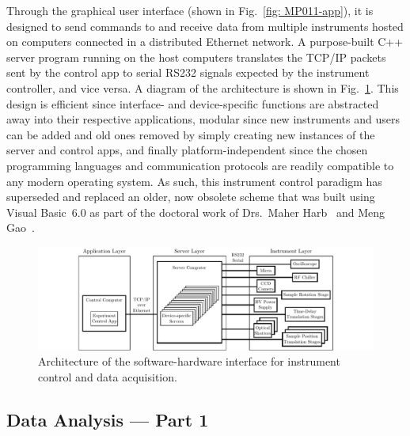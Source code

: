 Through the graphical user interface (shown in Fig.~\ref{fig: MP011-app}),
it is designed to send commands to and receive data from multiple instruments
hosted on computers connected in a distributed Ethernet network.
A purpose-built C++ server program running on the host computers translates
the TCP/IP packets sent by the control app to serial RS232 signals expected by
the instrument controller, and vice versa. A diagram of the architecture
is shown in Fig.~\ref{fig: MP011-net}.
This design is efficient
since interface- and device-specific functions are abstracted away into their respective applications,
modular since new instruments and users can be added and old ones removed
by simply creating new instances of the server and control apps,
and finally platform-independent since the chosen programming languages and communication protocols
are readily compatible to any modern operating system.
As such, this instrument control paradigm has superseded and replaced
an older, now obsolete scheme that was built using Visual Basic~6.0
as part of the doctoral work of Drs.~Maher Harb~\cite{Maher-thesis} and Meng Gao~\cite{Ray-thesis}.
%
\begin{figure}[ht!]
  \centering
  \includegraphics[width = \textwidth]{Figures/fig_ch2_MP011-net.pdf}
  \caption{
    Architecture of the software-hardware interface for instrument control and data acquisition.
  }
  \label{fig: MP011-net}
\end{figure}



\subsection{Data Analysis --- Part 1}
\label{sec: UED-data-analysis-1}

